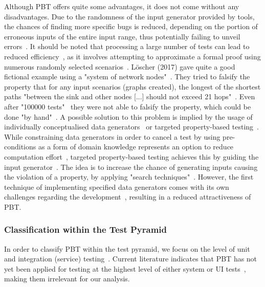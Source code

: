 \documentclass[runningheads]{llncs}
\begin{document}
Although PBT offers quite some advantages, it does not come without any disadvantages. Due to the randomness of the input generator provided by tools, the chances of finding more specific bugs is reduced, depending on the portion of erroneous inputs of the entire input range, thus potentially failing to unveil errors~\cite{Loescher2017,Padhye2019,ElazarMittelman2023,Shi2023}. It should be noted that processing a large number of tests can lead to reduced efficiency~\cite{ElazarMittelman2023,Shi2023}, as it involves attempting to approximate a formal proof using numerous randomly selected scenarios~\cite{Fink1997,ElazarMittelman2023,Paraskevopoulou2015}. Löscher (2017) gave quite a good fictional example using a "system of network nodes"~\cite{Loescher2017}. They tried to falsify the property that for any input scenarios (graphs created), the longest of the shortest paths "between the sink and other nodes [...] should not exceed 21 hops"~\cite{Loescher2017}. Even after "100000 tests"~\cite{Loescher2017} they were not able to falsify the property, which could be done "by hand"~\cite{Loescher2017}. A possible solution to this problem is implied by the usage of individually conceptualised data generators~\cite{Loescher2017,ElazarMittelman2023,Shi2023,Paraskevopoulou2015,Claessen2000} or targeted property-based testing~\cite{Loescher2017}. While constraining data generators in order to cancel a test by using pre-conditions as a form of domain knowledge represents an option to reduce computation effort~\cite{Loescher2017,ElazarMittelman2023,Shi2023}, targeted property-based testing achieves this by guiding the input generator~\cite{Loescher2017}. The idea is to increase the chance of generating inputs causing the violation of a property, by applying "search techniques"~\cite{Loescher2017}. However, the first technique of implementing specified data generators comes with its own challenges regarding the development~\cite{Loescher2017,ElazarMittelman2023,Shi2023}, resulting in a reduced attractiveness of PBT.

\subsubsection{Classification within the Test Pyramid}
In order to classify PBT within the test pyramid, we focus on the level of unit and integration (service) testing~\cite{Aniche2022,Radziwill2020}. Current literature indicates that PBT has not yet been applied for testing at the highest level of either system or UI tests~\cite{Radziwill2020,Aniche2022}, making them irrelevant for our analysis.
\end{document}

